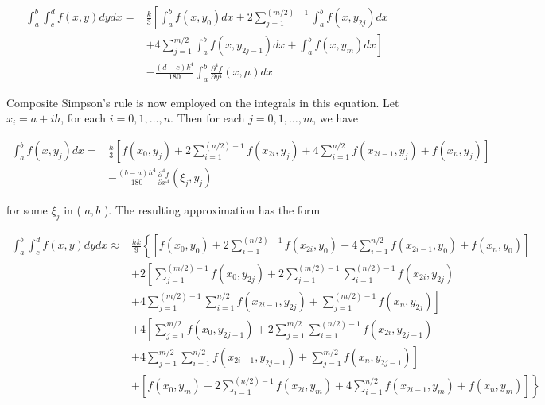 $$
\begin{aligned}
\int_{a}^{b} \int_{c}^{d} f(x, y) d y d x= & \frac{k}{3}\left[\int_{a}^{b} f\left(x, y_{0}\right) d x+2 \sum_{j=1}^{(m / 2)-1} \int_{a}^{b} f\left(x, y_{2 j}\right) d x\right. \\
& \left.+4 \sum_{j=1}^{m / 2} \int_{a}^{b} f\left(x, y_{2 j-1}\right) d x+\int_{a}^{b} f\left(x, y_{m}\right) d x\right] \\
& -\frac{(d-c) k^{4}}{180} \int_{a}^{b} \frac{\partial^{4} f}{\partial y^{4}}(x, \mu) d x
\end{aligned}
$$

Composite Simpson's rule is now employed on the integrals in this equation. Let $x_{i}=a+i h$, for each $i=0,1, \ldots, n$. Then for each $j=0,1, \ldots, m$, we have

$$
\begin{aligned}
\int_{a}^{b} f\left(x, y_{j}\right) d x= & \frac{h}{3}\left[f\left(x_{0}, y_{j}\right)+2 \sum_{i=1}^{(n / 2)-1} f\left(x_{2 i}, y_{j}\right)+4 \sum_{i=1}^{n / 2} f\left(x_{2 i-1}, y_{j}\right)+f\left(x_{n}, y_{j}\right)\right] \\
& -\frac{(b-a) h^{4}}{180} \frac{\partial^{4} f}{\partial x^{4}}\left(\xi_{j}, y_{j}\right)
\end{aligned}
$$

for some $\xi_{j}$ in ( $a, b$ ). The resulting approximation has the form

$$
\begin{aligned}
\int_{a}^{b} \int_{c}^{d} f(x, y) d y d x \approx & \frac{h k}{9}\left\{\left[f\left(x_{0}, y_{0}\right)+2 \sum_{i=1}^{(n / 2)-1} f\left(x_{2 i}, y_{0}\right)+4 \sum_{i=1}^{n / 2} f\left(x_{2 i-1}, y_{0}\right)+f\left(x_{n}, y_{0}\right)\right]\right. \\
& +2\left[\sum_{j=1}^{(m / 2)-1} f\left(x_{0}, y_{2 j}\right)+2 \sum_{j=1}^{(m / 2)-1} \sum_{i=1}^{(n / 2)-1} f\left(x_{2 i}, y_{2 j}\right)\right. \\
& \left.+4 \sum_{j=1}^{(m / 2)-1} \sum_{i=1}^{n / 2} f\left(x_{2 i-1}, y_{2 j}\right)+\sum_{j=1}^{(m / 2)-1} f\left(x_{n}, y_{2 j}\right)\right] \\
& +4\left[\sum_{j=1}^{m / 2} f\left(x_{0}, y_{2 j-1}\right)+2 \sum_{j=1}^{m / 2} \sum_{i=1}^{(n / 2)-1} f\left(x_{2 i}, y_{2 j-1}\right)\right. \\
& \left.+4 \sum_{j=1}^{m / 2} \sum_{i=1}^{n / 2} f\left(x_{2 i-1}, y_{2 j-1}\right)+\sum_{j=1}^{m / 2} f\left(x_{n}, y_{2 j-1}\right)\right] \\
& \left.+\left[f\left(x_{0}, y_{m}\right)+2 \sum_{i=1}^{(n / 2)-1} f\left(x_{2 i}, y_{m}\right)+4 \sum_{i=1}^{n / 2} f\left(x_{2 i-1}, y_{m}\right)+f\left(x_{n}, y_{m}\right)\right]\right\}
\end{aligned}
$$

